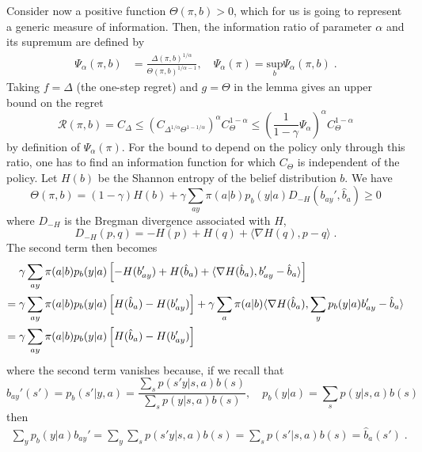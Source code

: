 \documentclass[aps,nofootinbib,groupaddress,superscriptaddress,reprint,amsmath,amssymb,graphicx,onecolumn,prx]{revtex4-2}
\begin{document}
Consider now a positive function $\Theta(\pi,b)>0$, which for us is going to represent a generic measure of information. Then, the information ratio of parameter $\alpha$ and its supremum are defined by
\begin{align}
    \Psi_\alpha(\pi, b)&=\frac{\Delta(\pi, b)^{1/\alpha}}{\Theta(\pi, b)^{1/\alpha-1}}, \quad
    \Psi_\alpha(\pi)=\underset{b}{\text{sup}}\Psi_\alpha(\pi, b) \; .
    \label{inforatioalpha}
\end{align}
Taking $f=\Delta$ (the one-step regret) and $g=\Theta$ in the lemma gives an upper bound on the regret
\begin{equation}
    \mathcal{R}(\pi,b)=C_\Delta\leq\left(C_{\Delta^{1/\alpha} \Theta^{1-1/\alpha}}\right)^\alpha C_\Theta^{1-\alpha}\leq\left(\frac{1}{1-\gamma}\Psi_\alpha\right)^\alpha C_\Theta^{1-\alpha}
    \label{regretboundalpha}
\end{equation}
by definition of $\Psi_\alpha(\pi)$. For the bound to depend on the policy only through this ratio, one has to find an information function for which $C_\Theta$ is independent of the policy. Let $H(b)$ be the Shannon entropy of the belief distribution $b$. We have
\begin{equation}
    \Theta(\pi,b)=(1-\gamma)H(b)+\gamma\sum_{ay}\pi(a|b)p_b(y|a)D_{-H}(b_{ay}',\hat{b}_a)\geq0
\end{equation}
where $D_{-H}$ is the Bregman divergence associated with $H$,
\begin{equation}
    D_{-H}(p,q)=-H(p)+H(q)+\langle\nabla H(q),p-q\rangle \; .
\end{equation}
The second term then becomes
\begin{align}
    &\gamma\sum_{ay}\pi(a|b)p_b(y|a)\left[-H(b_{ay}')+H(\hat{b}_a)+\langle\nabla H(\hat{b}_a),b_{ay}'-\hat{b}_a\rangle \right] \notag \\
    =\;&\gamma\sum_{ay}\pi(a|b)p_b(y|a)\left[H(\hat{b}_a)-H(b_{ay}')\right] +\gamma\sum_a\pi(a|b)\langle\nabla H(\hat{b}_a),\sum_yp_b(y|a)b_{ay}'-\hat{b}_a\rangle \notag \\
    =\;&\gamma\sum_{ay}\pi(a|b)p_b(y|a)\left[H(\hat{b}_a)-H(b_{ay}')\right]
\end{align}
where the second term vanishes because, if we recall that
\begin{equation}
    b_{ay}'(s')=p_b(s'|y,a)=\frac{\sum_s p(s'y|s,a)b(s)}{\sum_s p(y|s,a)b(s)}, \quad p_b(y|a)=\sum_s p(y|s,a)b(s)
\end{equation}
then
\begin{align}
\sum_y p_b(y|a) b_{ay}'=\sum_y \sum_s p(s'y|s,a)b(s) =\sum_s p(s'|s,a)b(s)=\hat{b}_a(s') \; .
\end{align}
\end{document}
